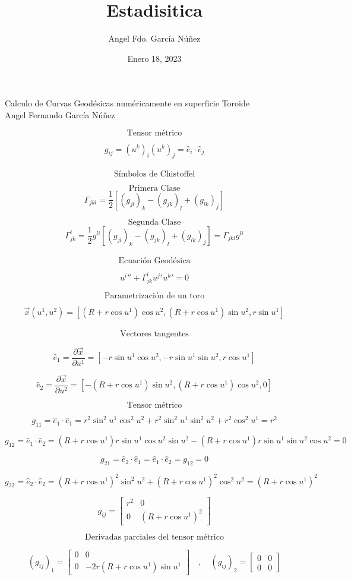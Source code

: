 \documentclass[10pt,a4papper]{article}
\author{Angel Fdo. García Núñez}
\date{Enero 18, 2023}
\title{Estadisitica}
\begin{document}
\Huge
Calculo de Curvas Geodésicas numéricamente
en superficie Toroide\\

Angel Fernando García Núñez

\Large
\newpage
\[\text{Tensor métrico}\]

\[g_{ij}=(u^k)_i(u^k)_j=\hat e_i\cdot\hat e_j\]\\

\[\text{Símbolos de Chistoffel}\]

\[\text{Primera Clase}\]
\[\Gamma_{jkl}=\frac{1}{2} \left[(g_{jl})_k-(g_{jk})_l+(g_{lk})_j\right]\]

\[\text{Segunda Clase}\]
\[\Gamma_{jk}^i=\frac{1}{2}g^{li}\left[(g_{jl})_k-(g_{jk})_l+(g_{lk})_j\right]=\Gamma_{jkl}g^{li}\]\\

\[\text{Ecuación Geodésica}\]

\[u^i''+\Gamma_{jk}^iu^j'u^k'=0\]

\newpage
\[\text{Parametrización de un toro}\]

\[\vec x(u^1,u^2)=\left[(R+r\cos u^1)\cos u^2,(R+r\cos u^1)\sin u^2,r\sin u^1\right]\]\\

\[\text{Vectores tangentes}\]

\[\hat e_1=\frac{\partial\vec x}{\partial u^1}=\left[-r\sin u^1\cos u^2,-r\sin u^1\sin u^2,r\cos u^1\right]\]

\[\hat e_2=\frac{\partial\vec x}{\partial u^2}=\left[-(R+r\cos u^1)\sin u^2,(R+r\cos u^1)\cos u^2,0\right]\]

\[\text{Tensor métrico}\]

\[g_{11}=\hat e_1\cdot\hat e_1=r^2\sin^2 u^1\cos^2 u^2+r^2\sin^2 u^1\sin^2 u^2+r^2\cos^2 u^1=r^2\]

\[g_{12}=\hat e_1\cdot\hat e_2=(R+r\cos u^1)r\sin u^1\cos u^2\sin u^2-(R+r\cos u^1)r\sin u^1\sin u^2\cos u^2=0\]

\[g_{21}=\hat e_2\cdot\hat e_1=\hat e_1\cdot\hat e_2=g_{12}=0\]

\[g_{22}=\hat e_2\cdot\hat e_2=(R+r\cos u^1)^2\sin^2 u^2+(R+r\cos u^1)^2\cos^2 u^2=(R+r\cos u^1)^2\]

\[g_{ij}=\begin{bmatrix}
r^2 & 0\\
0 & (R+r\cos u^1)^2
\end{bmatrix}\]

\[\text{Derivadas parciales del tensor métrico}\]

\[(g_{ij})_1=\begin{bmatrix}
0 & 0\\
0 & -2r(R+r\cos u^1)\sin u^1
\end{bmatrix}\quad,\quad
(g_{ij})_2=\begin{bmatrix}
0 & 0\\
0 & 0
\end{bmatrix}\]
\end{document}
